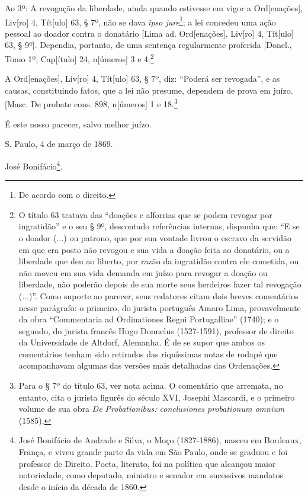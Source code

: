Ao 3º: A revogação da liberdade, ainda quando estivesse em vigor a
Ord{[}enações{]}, Liv{[}ro{]} 4, Tít{[}ulo{]} 63, § 7º, não se dava
\emph{ipso jure}\footnote{De acordo com o direito.}; a lei concedeu
uma ação pessoal ao doador contra o donatário {[}Lima ad.
Ord{[}enações{]}, Liv{[}ro{]} 4, Tít{[}ulo{]} 63, § 9º{]}. Dependia,
portanto, de uma sentença regularmente proferida {[}Donel., Tomo 1º,
Cap{[}ítulo{]} 24, n{[}úmeros{]} 3 e 4.\footnote{O título 63 tratava
  das ``doações e alforrias que se podem revogar por ingratidão'' e o seu
  § 9º, descontado referências internas, dispunha que: ``E se o doador
  (...) ou patrono, que por sua vontade livrou o escravo da servidão em
  que era posto não revogou e sua vida a doação feita ao donatário, ou a
  liberdade que deu ao liberto, por razão da ingratidão contra ele
  cometida, ou não moveu em sua vida demanda em juízo para revogar a
  doação ou liberdade, não poderão depois de sua morte seus herdeiros
  fazer tal revogação (...)''. Como suporte ao parecer, seus redatores
  citam dois breves comentários nesse parágrafo: o primeiro, do jurista
  português Amaro Lima, provavelmente da obra ``Commentaria ad
  Ordinationes Regni Portugalliae'' (1740); e o segundo, do jurista
  francês Hugo Donnelus (1527-1591), professor de direito da
  Universidade de Altdorf, Alemanha. É de se supor que ambos os
  comentários tenham sido retirados das riquíssimas notas de rodapé que
  acompanhavam algumas das versões mais detalhadas das Ordenações.}

A Ord{[}enações{]}, Liv{[}ro{]} 4, Tít{[}ulo{]} 63, § 7º, diz: ``Poderá
ser revogada'', e as causas, constituindo fatos, que a lei não presume,
dependem de prova em juízo. {[}Masc. De probate cons. 898, n{[}úmeros{]}
1 e 18.\footnote{Para o § 7º do título 63, ver nota acima. O
  comentário que arremata, no entanto, cita o jurista ligurês do século
  XVI, Josephi Mascardi, e o primeiro volume de sua obra \emph{De
  Probationibus: conclusiones probationum omnium} (1585).}

É este nosso parecer, salvo melhor juízo.

S. Paulo, 4 de março de 1869.

José Bonifácio\footnote{José Bonifácio de Andrade e Silva, o Moço
  (1827-1886), nasceu em Bordeaux, França, e viveu grande parte da vida
  em São Paulo, onde se graduou e foi professor de Direito. Poeta,
  literato, foi na política que alcançou maior notoriedade, como
  deputado, ministro e senador em sucessivos mandatos desde o início da
  década de 1860.}.


